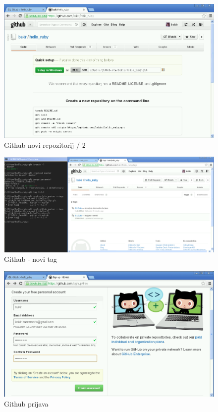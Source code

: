 \documentclass[times, utf8, seminar]{fit}
\begin{document}
\begin{figure}[H]
\centering
\includegraphics[width=15cm]{img/github_new_repos_2.png}
\caption{Github novi repozitorij / 2}
\end{figure}


\begin{figure}[H]
\centering
\includegraphics[width=16cm]{img/github_new_tag.png}
\caption{Github - novi tag}
\end{figure}

\begin{figure}[H]
\centering
\includegraphics[width=15cm]{img/github_prijava.png}
\caption{Github prijava}
\end{figure}
\end{document}
